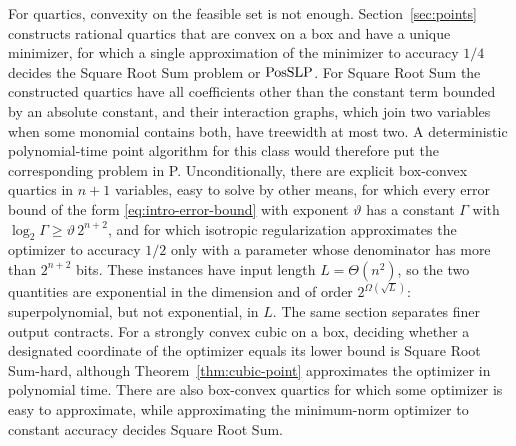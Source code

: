 For quartics, convexity on the feasible set is not enough.
Section~\ref{sec:points} constructs rational quartics that are convex on a
box and have a unique minimizer, for which a single approximation of the
minimizer to accuracy $1/4$ decides the Square Root Sum problem or $\mathrm{PosSLP}$.
For Square Root Sum the constructed quartics have all coefficients other than
the constant term bounded by an absolute constant, and their interaction
graphs, which join two variables when some monomial contains both, have
treewidth at most two. A deterministic polynomial-time point algorithm for
this class would therefore put the corresponding problem in P.
Unconditionally, there are explicit box-convex quartics in $n+1$ variables,
easy to solve by other means, for which every error bound of the form
\eqref{eq:intro-error-bound} with exponent $\vartheta$ has a constant $\Gamma$
with $\log_2\Gamma\ge\vartheta\,2^{n+2}$, and for which isotropic
regularization approximates the optimizer to accuracy $1/2$ only with a
parameter whose denominator has more than $2^{n+2}$ bits. These instances
have input length $L=\Theta(n^2)$, so the two quantities are exponential in
the dimension and of order $2^{\Omega(\sqrt L)}$: superpolynomial, but not
exponential, in $L$. The same section separates finer output contracts. For a
strongly convex cubic on a box, deciding whether a designated coordinate of
the optimizer equals its lower bound is Square Root Sum-hard, although
Theorem~\ref{thm:cubic-point} approximates the optimizer in polynomial time.
There are also box-convex quartics for which some optimizer is easy to
approximate, while approximating the minimum-norm optimizer to constant
accuracy decides Square Root Sum.

